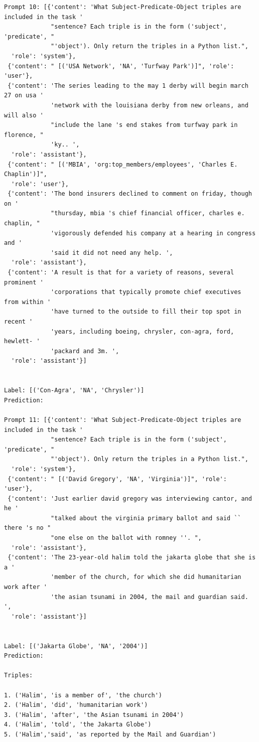 \documentclass{article}
\begin{document}
\begin{lstlisting}
Prompt 10: [{'content': 'What Subject-Predicate-Object triples are included in the task '
             "sentence? Each triple is in the form ('subject', 'predicate', "
             "'object'). Only return the triples in a Python list.",
  'role': 'system'},
 {'content': " [('USA Network', 'NA', 'Turfway Park')]", 'role': 'user'},
 {'content': 'The series leading to the may 1 derby will begin march 27 on usa '
             'network with the louisiana derby from new orleans, and will also '
             "include the lane 's end stakes from turfway park in florence, "
             'ky.. ',
  'role': 'assistant'},
 {'content': " [('MBIA', 'org:top_members/employees', 'Charles E. Chaplin')]",
  'role': 'user'},
 {'content': 'The bond insurers declined to comment on friday, though on '
             "thursday, mbia 's chief financial officer, charles e. chaplin, "
             'vigorously defended his company at a hearing in congress and '
             'said it did not need any help. ',
  'role': 'assistant'},
 {'content': 'A result is that for a variety of reasons, several prominent '
             'corporations that typically promote chief executives from within '
             'have turned to the outside to fill their top spot in recent '
             'years, including boeing, chrysler, con-agra, ford, hewlett- '
             'packard and 3m. ',
  'role': 'assistant'}]


Label: [('Con-Agra', 'NA', 'Chrysler')]
Prediction:

Prompt 11: [{'content': 'What Subject-Predicate-Object triples are included in the task '
             "sentence? Each triple is in the form ('subject', 'predicate', "
             "'object'). Only return the triples in a Python list.",
  'role': 'system'},
 {'content': " [('David Gregory', 'NA', 'Virginia')]", 'role': 'user'},
 {'content': 'Just earlier david gregory was interviewing cantor, and he '
             "talked about the virginia primary ballot and said `` there 's no "
             "one else on the ballot with romney ''. ",
  'role': 'assistant'},
 {'content': 'The 23-year-old halim told the jakarta globe that she is a '
             'member of the church, for which she did humanitarian work after '
             'the asian tsunami in 2004, the mail and guardian said. ',
  'role': 'assistant'}]


Label: [('Jakarta Globe', 'NA', '2004')]
Prediction:

Triples:

1. ('Halim', 'is a member of', 'the church')
2. ('Halim', 'did', 'humanitarian work')
3. ('Halim', 'after', 'the Asian tsunami in 2004')
4. ('Halim', 'told', 'the Jakarta Globe')
5. ('Halim','said', 'as reported by the Mail and Guardian')


\end{lstlisting}
\end{document}
